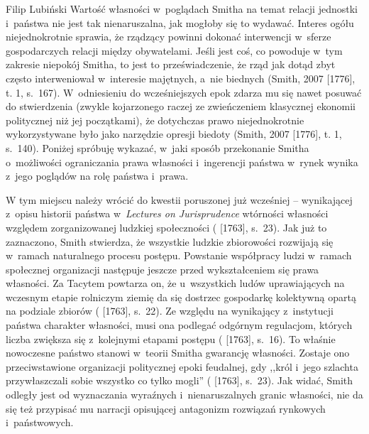 \begin{artplenv}{Filip Lubiński}
Wartość własności w~poglądach Smitha na temat relacji jednostki i~państwa nie jest tak nienaruszalna, jak mogłoby
się to wydawać. Interes ogółu niejednokrotnie sprawia, że rządzący powinni dokonać interwencji w~sferze gospodarczych
relacji między obywatelami. Jeśli jest coś, co powoduje w~tym zakresie niepokój Smitha, to jest to przeświadczenie, że
rząd jak dotąd zbyt często interweniował w~interesie majętnych, a~nie biednych
\label{ref:RNDKTNonQx9Ln}(Smith, 2007 [1776], t. 1, s.~167).
W~odniesieniu do wcześniejszych epok zdarza mu się nawet posuwać do stwierdzenia (zwykle
kojarzonego raczej ze zwieńczeniem klasycznej ekonomii politycznej niż jej początkami), że dotychczas prawo
niejednokrotnie wykorzystywane było jako narzędzie opresji biedoty
\label{ref:RNDK2BdJNopfX}(Smith, 2007 [1776], t. 1, s.~140).
Poniżej spróbuję wykazać, w~jaki sposób przekonanie Smitha o~możliwości ograniczania
prawa własności i~ingerencji państwa w~rynek wynika z~jego poglądów na rolę państwa i~prawa.

W tym miejscu należy wrócić do kwestii poruszonej już wcześniej -- wynikającej z~opisu historii
państwa w~\textit{Lectures on Jurisprudence} wtórności własności względem zorganizowanej ludzkiej społeczności
(\cite{smith_lectures_1982} [1763], s.~23).
Jak już to zaznaczono, Smith stwierdza, że wszystkie ludzkie
zbiorowości rozwijają się w~ramach naturalnego procesu postępu. Powstanie współpracy ludzi w~ramach społecznej
organizacji następuje jeszcze przed wykształceniem się prawa własności. Za Tacytem powtarza on, że u~wszystkich ludów
uprawiających na wczesnym etapie rolniczym ziemię da się dostrzec gospodarkę kolektywną opartą na podziale zbiorów
(\cite{smith_lectures_1982} [1763], s.~22).
Ze względu na wynikający z~instytucji państwa charakter
własności, musi ona podlegać odgórnym regulacjom, których liczba zwiększa się z~kolejnymi etapami postępu
(\cite{smith_lectures_1982} [1763], s.~16).
To właśnie nowoczesne państwo stanowi w~teorii Smitha gwarancję
własności. Zostaje ono przeciwstawione organizacji politycznej epoki feudalnej, gdy ,,król i~jego szlachta
przywłaszczali sobie wszystko co tylko mogli''
(\cite{smith_lectures_1982} [1763], s.~23).
Jak widać, Smith
odległy jest od wyznaczania wyraźnych i~nienaruszalnych granic własności, nie da się też przypisać mu narracji
opisującej antagonizm rozwiązań rynkowych i~państwowych.


\end{artplenv}

